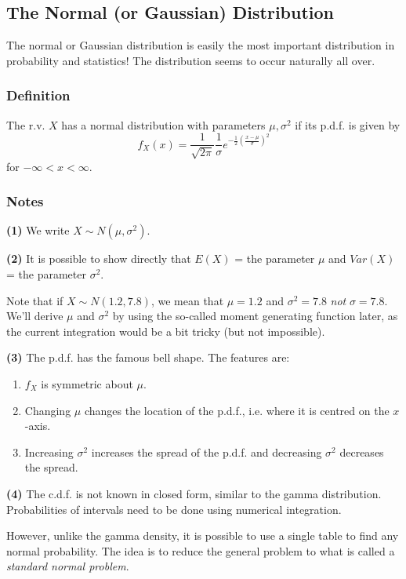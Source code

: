 \documentclass[12pt]{article}
\begin{document}
\subsection{The Normal (or Gaussian) Distribution}
The normal or Gaussian distribution is easily the most important distribution in probability and statistics! The distribution seems to occur naturally all over.

\subsubsection{Definition}
The r.v. $X$ has a normal distribution with parameters $\mu, \sigma^2$ if its p.d.f. is given by
\[
    f_X (x) = \frac{1}{\sqrt{2\pi}} \frac{1}{\sigma} e^{- \frac{1}{2} (\frac{x - \mu}{\sigma})^2}
\]
for $-\infty < x < \infty$.

\subsubsection{Notes}
\textbf{(1)}
We write $X \sim N(\mu, \sigma^2)$.

\textbf{(2)}
It is possible to show directly that $E(X)$ = the parameter $\mu$ and $Var(X)$ = the parameter $\sigma^2$. 

Note that if $X \sim N(1.2, 7.8)$, we mean that $\mu = 1.2$ and $\sigma^2 = 7.8$ \emph{not} $\sigma = 7.8$. We'll derive $\mu$ and $\sigma^2$ by using the so-called moment generating function later, as the current integration would be a bit tricky (but not impossible).

\textbf{(3)}
The p.d.f. has the famous bell shape. The features are:
\begin{enumerate}
    \item $f_X$ is symmetric about $\mu$.
    \item Changing $\mu$ changes the location of the p.d.f., i.e. where it is centred on the $x$-axis.
    \item Increasing $\sigma^2$ increases the spread of the p.d.f. and decreasing $\sigma^2$ decreases the spread.
\end{enumerate}

\textbf{(4)}
The c.d.f. is not known in closed form, similar to the gamma distribution. Probabilities of intervals need to be done using numerical integration. 

However, unlike the gamma density, it is possible to use a single table to find any normal probability. The idea is to reduce the general problem to what is called a \emph{standard normal problem}.
\end{document}
